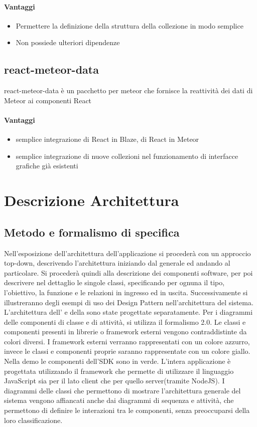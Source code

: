 \paragraph{Vantaggi}
\begin{itemize}
\item Permettere la definizione della struttura della collezione in modo semplice
\item Non possiede ulteriori dipendenze 
\end{itemize}


\subsection{react-meteor-data}
react-meteor-data è un pacchetto per meteor che fornisce la reattività
dei dati di Meteor ai componenti React

\paragraph{Vantaggi}
\begin{itemize}
\item semplice integrazione di React in Blaze, di React in Meteor
\item semplice integrazione di nuove collezioni nel funzionamento di
  interfacce grafiche già esistenti
\end{itemize}


\section{Descrizione Architettura}
\subsection{Metodo e formalismo di specifica}

Nell’esposizione dell’architettura dell’applicazione si procederà con
un approccio top-down, descrivendo l’architettura iniziando dal
generale ed andando al particolare. 
Si procederà quindi alla descrizione dei componenti software, per poi descrivere
nel dettaglio le singole classi, specificando per ognuna il tipo, l’obiettivo, la funzione e
le relazioni in ingresso ed in uscita.
Successivamente si illustreranno degli esempi di uso dei Design
Pattern nell’architettura del sistema. 
L'architettura dell'  e della  sono state progettate separatamente.  
Per i diagrammi delle componenti di classe e di attività, si utilizza
il formalismo  2.0. Le classi e componenti presenti in librerie o
framework esterni vengono contraddistinte da colori diversi. I
framework esterni verranno rappresentati con un colore azzurro, invece
le classi e componenti proprie saranno rappresentate con un
colore giallo. Nella demo le componenti dell'SDK sono in verde.
L'intera applicazione è progettata utilizzando il framework
 che permette di utilizzare il linguaggio JavaScript
sia per il lato client che per quello server(tramite NodeJS). 
I diagrammi delle classi che permettono di mostrare l’architettura
generale del sistema vengono affiancati anche dai diagrammi di
sequenza e attività, che permettono di definire le interazioni tra le
componenti, senza preoccuparsi della loro classificazione. 

